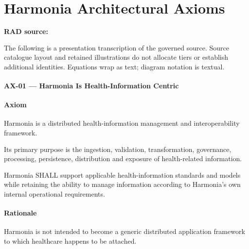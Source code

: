 \chapter{Harmonia Architectural Axioms}\label{rad:axioms}
\noindent\textbf{RAD source:} \texttt{}

The following is a presentation transcription of the governed source. Source catalogue layout and retained illustrations do not allocate tiers or establish additional identities. Equations wrap as text; diagram notation is textual.

\label{rad:axioms:74}
\subsubsection*{AX-01 --- Harmonia Is Health-Information Centric}
\label{rad:axioms:76}
\subsubsection*{Axiom}
\label{rad:axioms:78}

Harmonia is a distributed health-information management and interoperability framework.

\label{rad:axioms:81}

Its primary purpose is the ingestion, validation, transformation, governance, processing, persistence, distribution and exposure of health-related information.

\label{rad:axioms:85}

Harmonia SHALL support applicable health-information standards and models while retaining the ability to manage information according to Harmonia's own internal operational requirements.

\label{rad:axioms:89}
\subsubsection*{Rationale}
\label{rad:axioms:91}

Harmonia is not intended to become a generic distributed application framework to which healthcare happens to be attached.

\label{rad:axioms:94}

